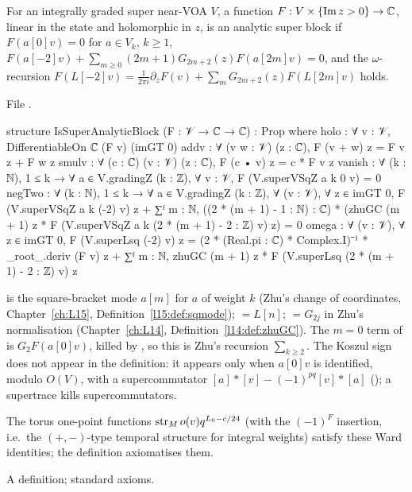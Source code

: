 \begin{definition}\label{l17:def:superblock}
For an integrally graded super near-VOA $V$, a function $F:V\times\{\operatorname{Im}z>0\}\to{\mathbb{C}}$, linear
in the state and holomorphic in $z$, is an analytic super block if $F(a[0]v)=0$ for $a\in V_k$, $k\ge1$,
$F(a[-2]v)+\sum_{m\ge0}(2m+1)G_{2m+2}(z)F(a[2m]v)=0$, and the $\omega$-recursion
$F(L[-2]v)=\frac1{2\pi i}\partial_zF(v)+\sum_mG_{2m+2}(z)F(L[2m]v)$ holds.
\end{definition}
\noindent File .
\begin{leancode}
structure IsSuperAnalyticBlock (F : 𝒱 → ℂ → ℂ) : Prop where
  holo : ∀ v : 𝒱, DifferentiableOn ℂ (F v) (imGT 0)
  addv : ∀ (v w : 𝒱) (z : ℂ), F (v + w) z = F v z + F w z
  smulv : ∀ (c : ℂ) (v : 𝒱) (z : ℂ), F (c • v) z = c * F v z
  vanish : ∀ (k : ℕ), 1 ≤ k → ∀ a ∈ V.gradingZ (k : ℤ), ∀ v : 𝒱,
    F (V.superVSqZ a k 0 v) = 0
  negTwo : ∀ (k : ℕ), 1 ≤ k → ∀ a ∈ V.gradingZ (k : ℤ), ∀ (v : 𝒱), ∀ z ∈ imGT 0,
    F (V.superVSqZ a k (-2) v) z
      + ∑ᶠ m : ℕ, ((2 * (m + 1) - 1 : ℕ) : ℂ)
          * (zhuGC (m + 1) z
            * F (V.superVSqZ a k (2 * (m + 1) - 2 : ℤ) v) z) = 0
  omega : ∀ (v : 𝒱), ∀ z ∈ imGT 0,
    F (V.superLsq (-2) v) z
      = (2 * (Real.pi : ℂ) * Complex.I)⁻¹ * _root_.deriv (F v) z
        + ∑ᶠ m : ℕ, zhuGC (m + 1) z
            * F (V.superLsq (2 * (m + 1) - 2 : ℤ) v) z
\end{leancode}
\begin{dictionary}
 is the square-bracket mode $a[m]$ for $a$ of weight $k$ (Zhu's change of
coordinates, Chapter~\ref{ch:L15}, Definition~\ref{l15:def:sqmode});  $=L[n]$;
 $=G_{2j}$ in Zhu's normalisation (Chapter~\ref{ch:L14}, Definition~\ref{l14:def:zhuGC}).
The $m=0$ term of  is $G_2F(a[0]v)$, killed by , so this is Zhu's recursion
$\sum_{k\ge2}$. The Koszul sign does not appear in the definition: it appears only when $a[0]v$ is
identified, modulo $O(V)$, with a supercommutator $[a]\ast[v]-(-1)^{pq}[v]\ast[a]$
(); a supertrace kills supercommutators.
\end{dictionary}
\begin{physics}
The torus one-point functions $\operatorname{str}_Mo(v)q^{L_0-c/24}$ (with the $(-1)^F$ insertion, i.e.\ the
$(+,-)$-type temporal structure for integral weights) satisfy these Ward identities; the definition
axiomatises them.
\end{physics}
\begin{status}
A definition; standard axioms.
\end{status}

